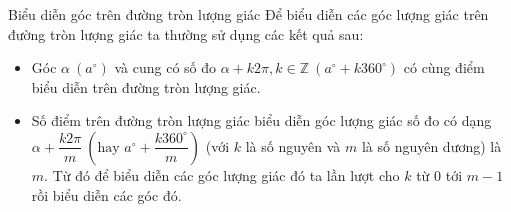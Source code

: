\begin{dang}{Biểu diễn góc trên đường tròn lượng giác}
	Để biểu diễn các góc lượng giác trên đường tròn lượng giác ta thường sử dụng các kết quả sau:
	\begin{itemize}
		\item Góc $\alpha\ \left(a^{\circ}\right)$  và cung có số đo $\alpha+k 2 \pi, k \in \mathbb{Z}\ \left(a^{\circ}+k360^{\circ}\right)$ có cùng điểm biểu diễn trên đường tròn lượng giác.
		\item Số điểm trên đường tròn lượng giác biểu diễn góc lượng giác số đo có dạng $\alpha+\dfrac{k 2 \pi}{m}\ \left(\text{hay } a^{\circ}+\dfrac{k360^{\circ}}{m}\right)$ (với $k$ là số nguyên và $m$ là số nguyên dương) là $m$. Từ đó để biểu diễn các góc lượng giác đó ta lần lượt cho $k$ từ 0 tới $m-1$ rồi biểu diễn các góc đó.
	\end{itemize}
	
\end{dang}
